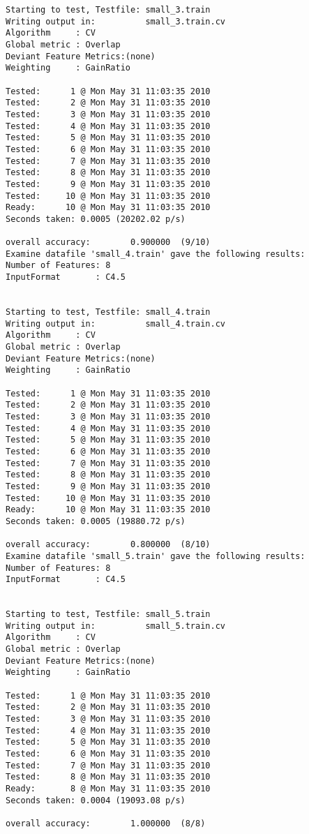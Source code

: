 \documentclass{report}
\begin{document}
\begin{footnotesize}
\begin{verbatim}
Starting to test, Testfile: small_3.train
Writing output in:          small_3.train.cv
Algorithm     : CV
Global metric : Overlap
Deviant Feature Metrics:(none)
Weighting     : GainRatio

Tested:      1 @ Mon May 31 11:03:35 2010
Tested:      2 @ Mon May 31 11:03:35 2010
Tested:      3 @ Mon May 31 11:03:35 2010
Tested:      4 @ Mon May 31 11:03:35 2010
Tested:      5 @ Mon May 31 11:03:35 2010
Tested:      6 @ Mon May 31 11:03:35 2010
Tested:      7 @ Mon May 31 11:03:35 2010
Tested:      8 @ Mon May 31 11:03:35 2010
Tested:      9 @ Mon May 31 11:03:35 2010
Tested:     10 @ Mon May 31 11:03:35 2010
Ready:      10 @ Mon May 31 11:03:35 2010
Seconds taken: 0.0005 (20202.02 p/s)

overall accuracy:        0.900000  (9/10)
Examine datafile 'small_4.train' gave the following results:
Number of Features: 8
InputFormat       : C4.5


Starting to test, Testfile: small_4.train
Writing output in:          small_4.train.cv
Algorithm     : CV
Global metric : Overlap
Deviant Feature Metrics:(none)
Weighting     : GainRatio

Tested:      1 @ Mon May 31 11:03:35 2010
Tested:      2 @ Mon May 31 11:03:35 2010
Tested:      3 @ Mon May 31 11:03:35 2010
Tested:      4 @ Mon May 31 11:03:35 2010
Tested:      5 @ Mon May 31 11:03:35 2010
Tested:      6 @ Mon May 31 11:03:35 2010
Tested:      7 @ Mon May 31 11:03:35 2010
Tested:      8 @ Mon May 31 11:03:35 2010
Tested:      9 @ Mon May 31 11:03:35 2010
Tested:     10 @ Mon May 31 11:03:35 2010
Ready:      10 @ Mon May 31 11:03:35 2010
Seconds taken: 0.0005 (19880.72 p/s)

overall accuracy:        0.800000  (8/10)
Examine datafile 'small_5.train' gave the following results:
Number of Features: 8
InputFormat       : C4.5


Starting to test, Testfile: small_5.train
Writing output in:          small_5.train.cv
Algorithm     : CV
Global metric : Overlap
Deviant Feature Metrics:(none)
Weighting     : GainRatio

Tested:      1 @ Mon May 31 11:03:35 2010
Tested:      2 @ Mon May 31 11:03:35 2010
Tested:      3 @ Mon May 31 11:03:35 2010
Tested:      4 @ Mon May 31 11:03:35 2010
Tested:      5 @ Mon May 31 11:03:35 2010
Tested:      6 @ Mon May 31 11:03:35 2010
Tested:      7 @ Mon May 31 11:03:35 2010
Tested:      8 @ Mon May 31 11:03:35 2010
Ready:       8 @ Mon May 31 11:03:35 2010
Seconds taken: 0.0004 (19093.08 p/s)

overall accuracy:        1.000000  (8/8)
\end{verbatim}
\end{footnotesize}
\end{document}
